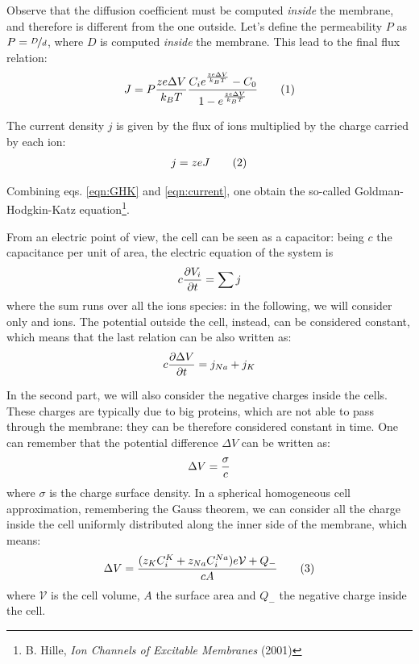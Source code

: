 \documentclass[11pt,a4 paper]{article}
\let\oldfrac\frac
\renewcommand{\frac}[3][d]{\ifthenelse{\equal{#1}{d}}{\oldfrac{#2}{#3}}{\nicefrac{#2}{#3}}}
\newcommand\numberthis{\addtocounter{equation}{1}\tag{\theequation}}
\begin{document}
Observe that the diffusion coefficient must be computed \emph{inside} the membrane, and therefore is different from the one outside. Let's define the permeability $P$ as $P = \frac[f]{D}{d}$, where $D$ is computed \emph{inside} the membrane. This lead to the final flux relation:
\begin{align*}
    J = P\frac{ze\Delta V}{k_BT} \frac{C_ie^{\frac{ze\Delta V}{k_BT} } - C_0 }{1 - e^{\frac{ze\Delta V}{k_BT} }} \numberthis \label{eqn:GHK}
\end{align*}

The current density $j$ is given by the flux of ions multiplied by the charge carried by each ion:
\begin{align*}
    j = zeJ \numberthis \label{eqn:current}
\end{align*}

Combining eqs. \eqref{eqn:GHK} and \eqref{eqn:current}, one obtain the so-called Goldman-Hodgkin-Katz equation\footnote{B. Hille, \emph{Ion Channels of Excitable Membranes} (2001)}.

\bigskip
From an electric point of view, the cell can be seen as a capacitor: being $c$ the capacitance per unit of area, the electric equation of the system is
\begin{align*}
    c \pdv{V_i}{t} = \sum j
\end{align*}
where the sum runs over all the ions species: in the following, we will consider only  and  ions. The potential outside the cell, instead, can be considered constant, which means that the last relation can be also written as:
\begin{align*}
    c \pdv{\Delta V}{t} = j_{Na} + j_K
\end{align*}

\bigskip
In the second part, we will also consider the negative charges inside the cells. These charges are typically due to big proteins, which are not able to pass through the membrane: they can be therefore considered constant in time. One can remember that the potential difference $\Delta V$ can be written as:
\begin{align*}
    \Delta V = \frac{\sigma}{c}
\end{align*}
where $\sigma$ is the charge surface density. In a spherical homogeneous cell approximation, remembering the Gauss theorem, we can consider all the charge inside the cell uniformly distributed along the inner side of the membrane, which means:
\begin{align*}
    \Delta V = \frac{(z_KC_i^K + z_{Na}C_i^{Na})e\mathcal{V} + Q_-}{cA} \numberthis \label{eqn:potwithchar}
\end{align*}
where $\mathcal{V}$ is the cell volume, $A$ the surface area and $Q_-$ the negative charge inside the cell.
\end{document}
